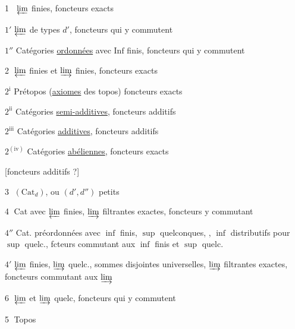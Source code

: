 \textcircled{\textcircled{1}} $\varprojlim$ finies, foncteurs exacts

\textcircled{\textcircled{$1'$}} $\varprojlim$ de types $d'$, foncteurs qui y commutent

\textcircled{$1''$} Catégories \uline{ordonnées} avec $\mathrm{Inf}$ finis, foncteurs qui y commutent

\textcircled{2} $\varprojlim$ finies et $\varinjlim$ finies, foncteurs exacts

\textcircled{$2^{\mathrm i}$} Prétopos (\uline{axiomes}  des topos) foncteurs exacts

\textcircled{$2^{\mathrm{ii}}$} Catégories \uline{semi-additives}, foncteurs additifs

\textcircled{$2^{\mathrm{iii}}$} Catégories \uline{additives}, foncteurs additifs

\textcircled{$2^{(\mathrm{iv})}$} Catégories \uline{abéliennes}, foncteurs exacts

\hfill[foncteurs additifs ?]


\textcircled{3} $(\mathrm{Cat}_{d})$, ou $(d',d'')$ petits

\textcircled{4} Cat avec $\varprojlim$ finies, $\varinjlim$ filtrantes exactes, foncteurs y commutant

\textcircled{$4''$} Cat. préordonnées avec $\inf$ finis, $\sup$ quelconques, , $\inf$ distributifs pour $\sup$ quelc., fcteurs commutant aux $\inf$ finis et $\sup$ quelc.

\textcircled{$4'$} $\varprojlim$ finies, $\varinjlim$ quelc., sommes disjointes universelles, $\varinjlim$ filtrantes exactes, foncteurs  commutant aux $\varinjlim$

\textcircled{6} $\varprojlim$ et $\varinjlim$ quelc, foncteurs qui y commutent

\textcircled{5} Topos

